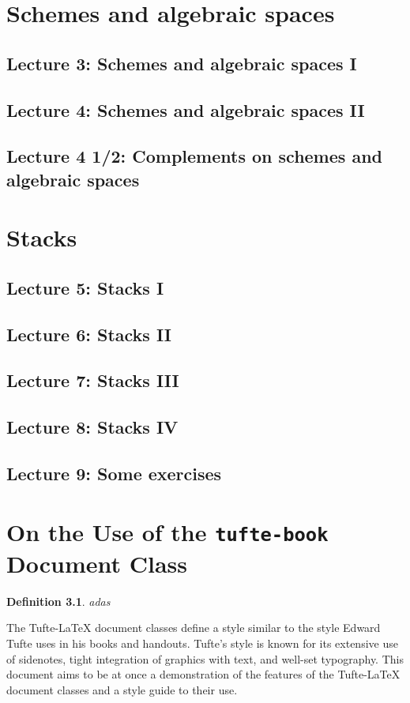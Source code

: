 \documentclass{tufte-book} %
\newcommand{\TL}{Tufte-\LaTeX\xspace}
\numberwithin{dummy}{section}
\newtheorem{dfn}[thm]{Definition}
\begin{document}
\chapter{Schemes and algebraic spaces}
\section{Lecture 3: Schemes and algebraic spaces I}
\section{Lecture 4: Schemes and algebraic spaces II}
\section{Lecture 4 1/2: Complements on schemes and algebraic spaces}
\chapter{Stacks}
\section{Lecture 5: Stacks I}
\section{Lecture 6: Stacks II}
\section{Lecture 7: Stacks III}
\section{Lecture 8: Stacks IV}
\section{Lecture 9: Some exercises}
\chapter[On the Use of the tufte-book Document Class]{On the Use of the \texttt{tufte-book} Document Class}
\label{ch:tufte-book}

\begin{dfn}
adas
\end{dfn}
The \TL document classes define a style similar to the style Edward Tufte uses in his books and handouts. Tufte's style is known for its extensive use of sidenotes, tight integration of graphics with text, and well-set typography. This document aims to be at once a demonstration of the features of the \TL document classes and a style guide to their use.
\end{document}
